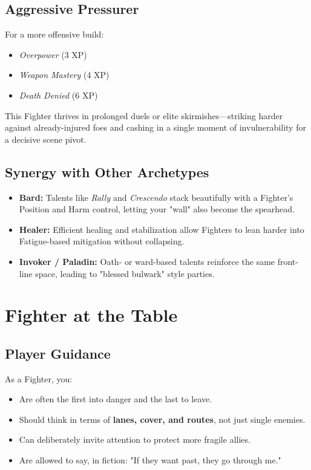 \documentclass[11pt]{book}
\begin{document}
\subsection{Aggressive Pressurer}

For a more offensive build:
\begin{itemize}
  \item \emph{Overpower} (3 XP)
  \item \emph{Weapon Mastery} (4 XP)
  \item \emph{Death Denied} (6 XP)
\end{itemize}

This Fighter thrives in prolonged duels or elite skirmishes---striking harder
against already-injured foes and cashing in a single moment of invulnerability
for a decisive scene pivot.

\subsection{Synergy with Other Archetypes}

\begin{itemize}
  \item \textbf{Bard:} Talents like \emph{Rally} and \emph{Crescendo}
        stack beautifully with a Fighter's Position and Harm control,
        letting your "wall" also become the spearhead.
  \item \textbf{Healer:} Efficient healing and stabilization allow Fighters to
        lean harder into Fatigue-based mitigation without collapsing.
  \item \textbf{Invoker / Paladin:} Oath- or ward-based talents reinforce
        the same front-line space, leading to "blessed bulwark" style parties.
\end{itemize}

\section{Fighter at the Table}

\subsection{Player Guidance}

As a Fighter, you:
\begin{itemize}
  \item Are often the first into danger and the last to leave.
  \item Should think in terms of \textbf{lanes, cover, and routes},
        not just single enemies.
  \item Can deliberately invite attention to protect more fragile allies.
  \item Are allowed to say, in fiction: "If they want past, they go through me."
\end{itemize}
\end{document}
